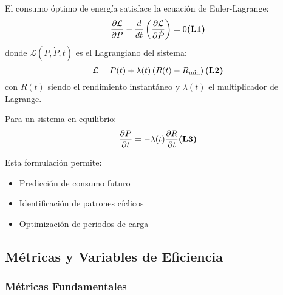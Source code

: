 \begin{teorema}
El consumo óptimo de energía satisface la ecuación de Euler-Lagrange:
\begin{equation}
    \frac{\partial \mathcal{L}}{\partial P} - \frac{d}{dt}\left(\frac{\partial \mathcal{L}}{\partial \dot{P}}\right) = 0 \textbf{(L1)}
\end{equation}
donde $\mathcal{L}(P, \dot{P}, t)$ es el Lagrangiano del sistema:
\begin{equation}
    \mathcal{L} = P(t) + \lambda(t)\left(R(t) - R_{\text{min}}\right) \textbf{(L2)}
\end{equation}
con $R(t)$ siendo el rendimiento instantáneo y $\lambda(t)$ el multiplicador de Lagrange.
\end{teorema}

\begin{corolario}
Para un sistema en equilibrio:
\begin{equation}
    \frac{\partial P}{\partial t} = -\lambda(t)\frac{\partial R}{\partial t} \textbf{(L3)}
\end{equation}
\end{corolario}

Esta formulación permite:
\begin{itemize}
    \item Predicción de consumo futuro
    \item Identificación de patrones cíclicos
    \item Optimización de periodos de carga
\end{itemize}

\subsection{Métricas y Variables de Eficiencia}

\subsubsection{Métricas Fundamentales}

